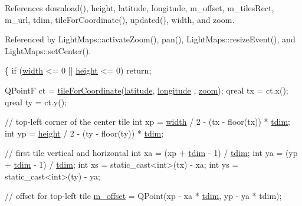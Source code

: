 References download(), height, latitude, longitude, m\-\_\-offset, m\-\_\-tiles\-Rect, m\-\_\-url, tdim, tile\-For\-Coordinate(), updated(), width, and zoom.



Referenced by Light\-Maps\-::activate\-Zoom(), pan(), Light\-Maps\-::resize\-Event(), and Light\-Maps\-::set\-Center().


\begin{DoxyCode}
\{
    \textcolor{keywordflow}{if} (\hyperlink{classSlippyMap_ada3532095a8c4083e9da3db17de29fc1}{width} <= 0 || \hyperlink{classSlippyMap_aacec4be5e2b83eb2744a3b3b03c4af7a}{height} <= 0)
        \textcolor{keywordflow}{return};

    QPointF ct = \hyperlink{slippymap_8cpp_a7b006b28fd0e4ace99c58e6162b501c9}{tileForCoordinate}(\hyperlink{classSlippyMap_a223220fdcbf2197845f009d48225c0c8}{latitude}, \hyperlink{classSlippyMap_af93efe003c192b7bc6a1ece6c7342de6}{longitude}
      , \hyperlink{classSlippyMap_a13dcc9915570a1a333c1e9275ffe64b3}{zoom});
    qreal tx = ct.x();
    qreal ty = ct.y();

    \textcolor{comment}{// top-left corner of the center tile}
    \textcolor{keywordtype}{int} xp = \hyperlink{classSlippyMap_ada3532095a8c4083e9da3db17de29fc1}{width} / 2 - (tx - floor(tx)) * \hyperlink{slippymap_8cpp_a8ce10e914ae6c794640aeae2e2781d83}{tdim};
    \textcolor{keywordtype}{int} yp = \hyperlink{classSlippyMap_aacec4be5e2b83eb2744a3b3b03c4af7a}{height} / 2 - (ty - floor(ty)) * \hyperlink{slippymap_8cpp_a8ce10e914ae6c794640aeae2e2781d83}{tdim};

    \textcolor{comment}{// first tile vertical and horizontal}
    \textcolor{keywordtype}{int} xa = (xp + \hyperlink{slippymap_8cpp_a8ce10e914ae6c794640aeae2e2781d83}{tdim} - 1) / \hyperlink{slippymap_8cpp_a8ce10e914ae6c794640aeae2e2781d83}{tdim};
    \textcolor{keywordtype}{int} ya = (yp + \hyperlink{slippymap_8cpp_a8ce10e914ae6c794640aeae2e2781d83}{tdim} - 1) / \hyperlink{slippymap_8cpp_a8ce10e914ae6c794640aeae2e2781d83}{tdim};
    \textcolor{keywordtype}{int} xs = \textcolor{keyword}{static\_cast<}\textcolor{keywordtype}{int}\textcolor{keyword}{>}(tx) - xa;
    \textcolor{keywordtype}{int} ys = \textcolor{keyword}{static\_cast<}\textcolor{keywordtype}{int}\textcolor{keyword}{>}(ty) - ya;

    \textcolor{comment}{// offset for top-left tile}
    \hyperlink{classSlippyMap_a705bb1600f5003868b890f1e25a198a6}{m\_offset} = QPoint(xp - xa * \hyperlink{slippymap_8cpp_a8ce10e914ae6c794640aeae2e2781d83}{tdim}, yp - ya * tdim);


\end{DoxyCode}

